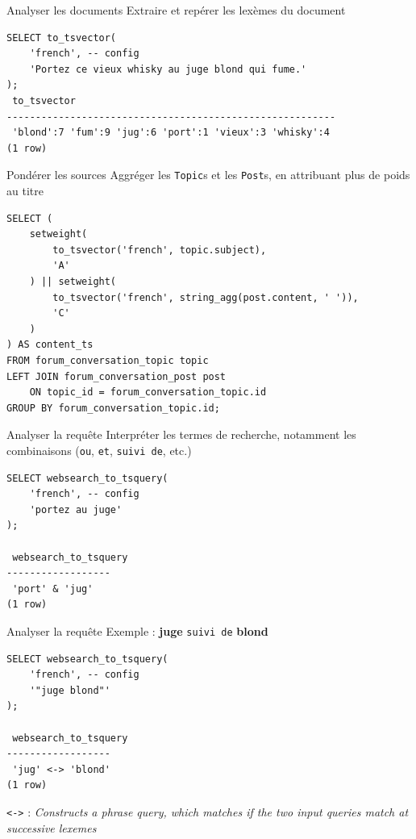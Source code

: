\documentclass{beamer}
\begin{document}
\begin{frame}[fragile]{Analyser les documents}
    Extraire et repérer les lexèmes du document
    \begin{verbatim}
SELECT to_tsvector(
    'french', -- config
    'Portez ce vieux whisky au juge blond qui fume.'
);
 to_tsvector
---------------------------------------------------------
 'blond':7 'fum':9 'jug':6 'port':1 'vieux':3 'whisky':4
(1 row)
    \end{verbatim}
\end{frame}

\begin{frame}[fragile]{Pondérer les sources}
    Aggréger les \texttt{Topic}s et les \texttt{Post}s, en attribuant plus de poids au titre
    \begin{verbatim}
SELECT (
    setweight(
        to_tsvector('french', topic.subject),
        'A'
    ) || setweight(
        to_tsvector('french', string_agg(post.content, ' ')),
        'C'
    )
) AS content_ts
FROM forum_conversation_topic topic
LEFT JOIN forum_conversation_post post
    ON topic_id = forum_conversation_topic.id
GROUP BY forum_conversation_topic.id;
    \end{verbatim}
\end{frame}

\begin{frame}[fragile]{Analyser la requête}
    Interpréter les termes de recherche, notamment les combinaisons (\texttt{ou}, \texttt{et}, \texttt{suivi de}, etc.)
    \begin{verbatim}
SELECT websearch_to_tsquery(
    'french', -- config
    'portez au juge'
);

 websearch_to_tsquery
------------------
 'port' & 'jug'
(1 row)
    \end{verbatim}
\end{frame}

\begin{frame}[fragile]{Analyser la requête}
    Exemple : \textbf{juge} \texttt{suivi de} \textbf{blond}
    \begin{verbatim}
SELECT websearch_to_tsquery(
    'french', -- config
    '"juge blond"'
);

 websearch_to_tsquery
------------------
 'jug' <-> 'blond'
(1 row)
    \end{verbatim}

    \texttt{<->} : \textit{Constructs a phrase query, which matches if the two input queries match at successive lexemes}
\end{frame}
\end{document}
